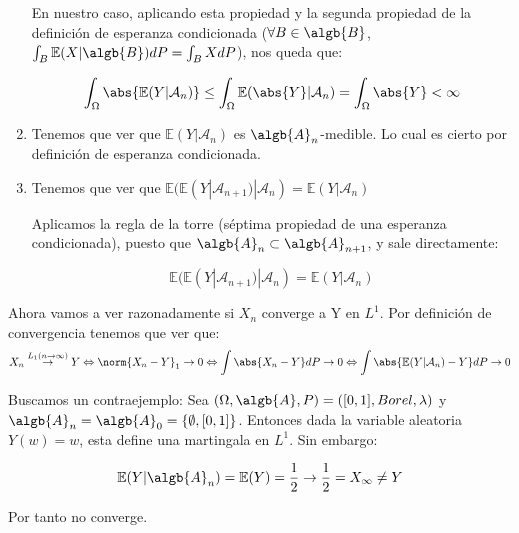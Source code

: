 \begin{problem}[1]
\begin{enumerate}
En nuestro caso, aplicando esta propiedad y la segunda propiedad de la definición de esperanza condicionada ($\forall B \in \algb{B}$, $\int_{B}\mathbb{E}(X|\algb{B})dP=\int_{B}XdP$), nos queda que:

\[
\int_{\Omega} \abs{\mathbb{E}(Y|\mathcal{A}_n)} \leq  \int_{\Omega} \mathbb{E}(\abs{Y}|\mathcal{A}_n) = \int_{\Omega} \abs{Y} < \infty
\]


\item Tenemos que ver que $\mathbb{E}(Y|\mathcal{A}_n)$ es $\algb{A}_n$-medible. Lo cual es cierto por definición de esperanza condicionada.

\item Tenemos que ver que $\mathbb{E}(\mathbb{E}(Y|\mathcal{A}_{n+1})|\mathcal{A}_n) = \mathbb{E}(Y|\mathcal{A}_n)$

Aplicamos la regla de la torre (séptima propiedad de una esperanza condicionada), puesto que $\algb{A}_n \subset \algb{A}_{n+1}$, y sale directamente:

\[
\mathbb{E}(\mathbb{E}(Y|\mathcal{A}_{n+1})|\mathcal{A}_n) = \mathbb{E}(Y|\mathcal{A}_n)
\]

\end{enumerate}
Ahora vamos a ver razonadamente si $X_n$ converge a Y en $L^1$. Por definición de convergencia tenemos que ver que:
\[
X_n \stackrel{L_1 (n\rightarrow \infty)}{\rightarrow} Y \Leftrightarrow \norm{X_n -Y}_1  \rightarrow 0 \Leftrightarrow \int{\abs{X_n -Y}dP} \rightarrow 0 \Leftrightarrow \int{\abs{\mathbb{E}(Y|\mathcal{A}_n) -Y}dP} \rightarrow 0
\]


Buscamos un contraejemplo:
Sea $(\Omega, \algb{A}, P)=([0,1], Borel, \lambda)$ y $\algb{A}_n = \algb{A}_0 = \{\emptyset, [0,1] \}$. Entonces dada la variable aleatoria $Y(w)=w$, esta define una martingala en $L^1$. Sin embargo:


\[
\mathbb{E}(Y|\algb{A}_n)=\mathbb{E}(Y) = \frac{1}{2} \rightarrow \frac{1}{2}=X_{\infty}\neq Y
\]

Por tanto no converge.





\end{problem}


